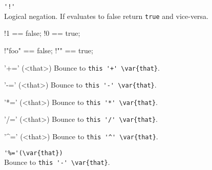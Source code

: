 \begin{urbiscriptapi}
\item \lstinline|'!'|\\
  Logical negation.  If \this evaluates to false return \lstinline|true| and
  vice-versa.
\begin{urbiassert}
!1 == false;
!0 == true;

!"foo" == false;
!""    == true;
\end{urbiassert}

\item['+='](<that>)%
  Bounce to \lstinline|this '+' \var{that}|.

\item['-='](<that>)%
  Bounce to \lstinline|this '-' \var{that}|.

\item['*='](<that>)%
  Bounce to \lstinline|this '*' \var{that}|.

\item['/='](<that>)%
  Bounce to \lstinline|this '/' \var{that}|.

\item['^='](<that>)%
  Bounce to \lstinline|this '^' \var{that}|.

\item \lstinline|'%='(\var{that})|\\
  Bounce to \lstinline|this '-' \var{that}|.

\end{urbiscriptapi}

